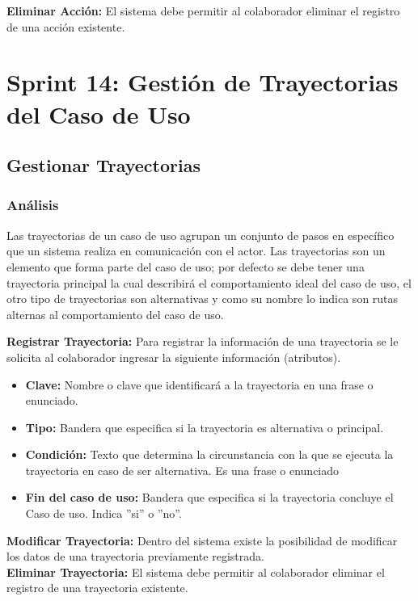 \textbf {Eliminar Acción:} 
El sistema debe permitir al colaborador eliminar el registro de una acción existente.\\


\section{Sprint 14: Gestión de Trayectorias del Caso de Uso}
\subsection{Gestionar Trayectorias}
\subsubsection {Análisis}

Las trayectorias de un caso de uso agrupan un conjunto de pasos en específico que un sistema realiza en comunicación con el actor. Las trayectorias son un elemento que forma parte del caso de uso; por defecto se debe tener una trayectoria principal la cual describirá el comportamiento ideal del caso de uso, el otro tipo de trayectorias son alternativas y como su nombre lo indica son rutas alternas al comportamiento del caso de uso.

\textbf {Registrar Trayectoria:}
Para registrar la información de una trayectoria se le solicita al colaborador ingresar la siguiente información (atributos).
\begin{itemize}
	
	\item \textbf{Clave:} Nombre o clave que identificará a la trayectoria en una frase o enunciado.
	\item \textbf{Tipo:} Bandera que especifica si la trayectoria es alternativa o principal.
	\item \textbf{Condición:} Texto que determina la circunstancia con la que se ejecuta la trayectoria en caso de ser alternativa. Es una frase o enunciado
	\item \textbf{Fin del caso de uso:} Bandera que especifica si la trayectoria concluye el Caso de uso. Indica ”si” o ”no”.
	
\end{itemize}

\textbf {Modificar Trayectoria:}
Dentro del sistema existe la posibilidad de modificar los datos de una trayectoria previamente registrada.\\

\textbf {Eliminar Trayectoria:} 
El sistema debe permitir al colaborador eliminar el registro de una trayectoria existente.\\

